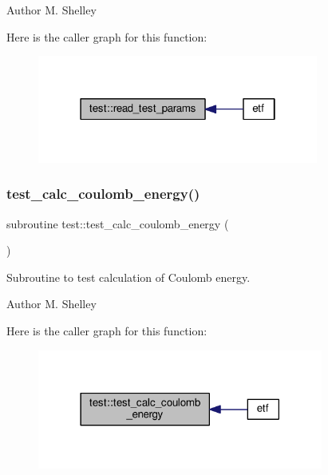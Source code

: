 \begin{DoxyAuthor}{Author}
M. Shelley 
\end{DoxyAuthor}
Here is the caller graph for this function\+:
\nopagebreak
\begin{figure}[H]
\begin{center}
\leavevmode
\includegraphics[width=262pt]{namespacetest_a2d72f655d80bac0b01030b9cbda3518f_icgraph}
\end{center}
\end{figure}
\mbox{\label{namespacetest_ae4857dad0359d5f90718d5593398f8b3}} 
\subsubsection{\texorpdfstring{test\+\_\+calc\+\_\+coulomb\+\_\+energy()}{test\_calc\_coulomb\_energy()}}
{\footnotesize\ttfamily subroutine test\+::test\+\_\+calc\+\_\+coulomb\+\_\+energy (\begin{DoxyParamCaption}{ }\end{DoxyParamCaption})}



Subroutine to test calculation of Coulomb energy. 

\begin{DoxyAuthor}{Author}
M. Shelley 
\end{DoxyAuthor}
Here is the caller graph for this function\+:
\nopagebreak
\begin{figure}[H]
\begin{center}
\leavevmode
\includegraphics[width=266pt]{namespacetest_ae4857dad0359d5f90718d5593398f8b3_icgraph}
\end{center}
\end{figure}
\mbox{\label{namespacetest_af860540d68e055817e3f618b7a04298a}} 
